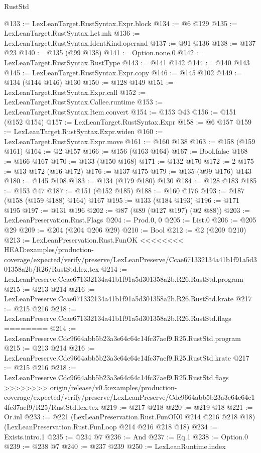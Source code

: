 \begin{lexlean}{RustStd}
\begin{coremodule}
{\begin{coremodule}
{{{{{@133 := LexLeanTarget.RustSyntax.Expr.block
@134 := @6 @129
@135 := LexLeanTarget.RustSyntax.Let.mk
@136 := LexLeanTarget.RustSyntax.IdentKind.operand
@137 := @91 @136
@138 := @137 @23
@140 := @135 (@99 @138)
@141 := Option.none.{0}
@142 := LexLeanTarget.RustSyntax.RustType
@143 := @141 @142
@144 := @140 @143
@145 := LexLeanTarget.RustSyntax.Expr.copy
@146 := @145 @102
@149 := @134 (@144 @146) @130
@150 := @128 @149
@151 := LexLeanTarget.RustSyntax.Expr.call
@152 := LexLeanTarget.RustSyntax.Callee.runtime
@153 := LexLeanTarget.RustSyntax.Item.convert
@154 := @153 @43
@156 := @151 (@152 @154)
@157 := LexLeanTarget.RustSyntax.Expr
@158 := @6 @157
@159 := LexLeanTarget.RustSyntax.Expr.widen
@160 := LexLeanTarget.RustSyntax.Expr.move
@161 := @160 @138
@163 := @158 (@159 @161)
@164 := @2 @157
@166 := @156 (@163 @164)
@167 := Bool.false
@168 := @166 @167
@170 := @133 (@150 @168)
@171 := @132 @170
@172 := 2
@175 := @13 @172 (@16 @172)
@176 := @137 @175
@179 := @135 (@99 @176) @143
@180 := @145 @108
@183 := @134 (@179 @180) @130
@184 := @128 @183
@185 := @153 @47
@187 := @151 (@152 @185)
@188 := @160 @176
@193 := @187 (@158 (@159 @188) @164) @167
@195 := @133 (@184 @193)
@196 := @171 @195
@197 := @131 @196
@202 := @87 (@89 (@127 @197) (@2 @88))
@203 := LexLeanPreservation.Rust.Flags
@204 := Prod.{0, 0}
@205 := List.{0}
@206 := @205 @29
@209 := @204 (@204 @206 @29)
@210 := Bool
@212 := @2 (@209 @210)
@213 := LexLeanPreservation.Rust.FunOK
<<<<<<<< HEAD:examples/production-coverage/expected/verify/preserve/LexLeanPreserve/Ccae671332134a41b1f91a5d301358a2b/R26/RustStd.lex.tex
@214 := LexLeanPreserve.Ccae671332134a41b1f91a5d301358a2b.R26.RustStd.program
@215 := @213 @214
@216 := LexLeanPreserve.Ccae671332134a41b1f91a5d301358a2b.R26.RustStd.krate
@217 := @215 @216
@218 := LexLeanPreserve.Ccae671332134a41b1f91a5d301358a2b.R26.RustStd.flags
========
@214 := LexLeanPreserve.Cdc9664abb5b23a3e64c64c14fc37aef9.R25.RustStd.program
@215 := @213 @214
@216 := LexLeanPreserve.Cdc9664abb5b23a3e64c64c14fc37aef9.R25.RustStd.krate
@217 := @215 @216
@218 := LexLeanPreserve.Cdc9664abb5b23a3e64c64c14fc37aef9.R25.RustStd.flags
>>>>>>>> origin/release/v0.5:examples/production-coverage/expected/verify/preserve/LexLeanPreserve/Cdc9664abb5b23a3e64c64c14fc37aef9/R25/RustStd.lex.tex
@219 := @217 @218
@220 := @219 @18
@221 := Or.inl
@233 := @221
    (LexLeanPreservation.Rust.FunOK0 @214 @216 @218 @18)
    (LexLeanPreservation.Rust.FunLoop @214 @216 @218 @18)
@234 := Exists.intro.{1}
@235 := @234 @7
@236 := And
@237 := Eq.{1}
@238 := Option.{0}
@239 := @238 @7
@240 := @237 @239
@250 := LexLeanRuntime.index
}}}}}
\end{coremodule}}
\end{coremodule}
\end{lexlean}
